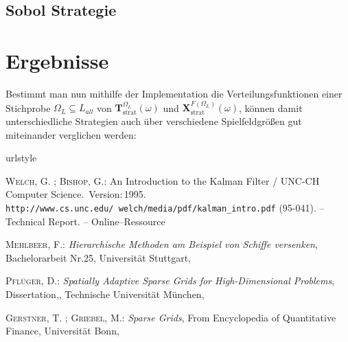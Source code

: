 \documentclass[a4paper,12pt]{llncs}
\numberwithin{equation}{section}
\DeclareMathOperator{\strat}{strat}
\begin{document}
\subsection{Sobol Strategie}


\section{Ergebnisse}

Bestimmt man nun mithilfe der Implementation die Verteilungsfunktionen einer Stichprobe $\Omega_L \subseteq L_{all}$ von $\mathbf{T}^{\Omega_L}_{\strat}(\omega)$ und $\mathbf{X}^{F(\Omega_L)}_{\strat}(\omega)$, können damit unterschiedliche Strategien auch über verschiedene Spielfeldgrößen gut miteinander verglichen werden:

\begin{landscape}
	
\end{landscape}


\newpage

% 

\begin{thebibliography}{WB95}
	\providecommand{\url}[1]{\texttt{#1}}
	\expandafter\ifx\csname urlstyle\endcsname\relax
	\providecommand{\doi}[1]{doi: #1}\else
	\providecommand{\doi}{doi: \begingroup \urlstyle{rm}\Url}\fi
	
	\textsc{Welch}, G. ; \textsc{Bishop}, G.:
	\newblock An Introduction to the Kalman Filter  / UNC-CH Computer Science.
	\newblock \,Version:\,1995.
	\newblock  \url{http://www.cs.unc.edu/~welch/media/pdf/kalman_intro.pdf}
	(95-041). --
	\newblock Technical Report. --
	\newblock Online--Ressource
	
	\textsc{Mehlbeer}, F.:
	\newblock \textit{Hierarchische Methoden am Beispiel von Schiffe versenken},
	\newblock Bachelorarbeit Nr.25,
	\newblock Universität Stuttgart,
	
	\textsc{Pflüger}, D.:
	\newblock \textit{Spatially Adaptive Sparse Grids for High-Dimensional Problems},
	\newblock Dissertation,,
	\newblock Technische Universität München,
	
	\textsc{Gerstner}, T. ; \textsc{Griebel}, M.:
	\newblock \textit{Sparse Grids},
	\newblock From Encyclopedia of Quantitative Finance,
	\newblock Universität Bonn,
	
\end{thebibliography}


\end{document}

